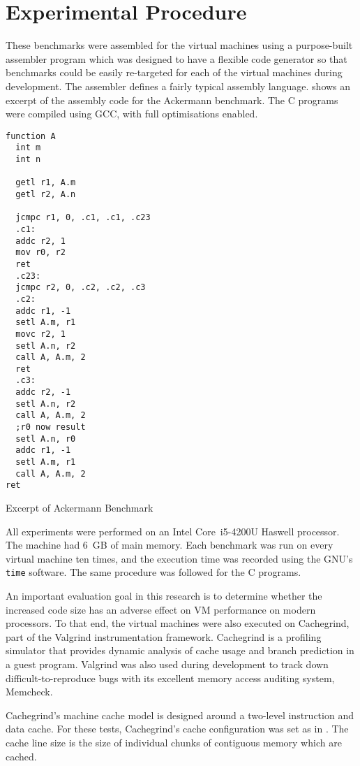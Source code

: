 	\section{Experimental Procedure}
	These benchmarks were assembled for the virtual machines using a purpose-built assembler program which was designed to have a flexible code generator so that benchmarks could be easily re-targeted for each of the virtual machines during development. The assembler defines a fairly typical assembly language.  shows an excerpt of the assembly code for the Ackermann benchmark. The C programs were compiled using GCC, with full optimisations enabled.
	
	\begin{myfigure}
		\begin{lstlisting}
function A
  int m
  int n

  getl r1, A.m
  getl r2, A.n

  jcmpc r1, 0, .c1, .c1, .c23
  .c1:
  addc r2, 1
  mov r0, r2
  ret
  .c23:
  jcmpc r2, 0, .c2, .c2, .c3
  .c2:
  addc r1, -1
  setl A.m, r1
  movc r2, 1
  setl A.n, r2
  call A, A.m, 2
  ret
  .c3:
  addc r2, -1
  setl A.n, r2
  call A, A.m, 2
  ;r0 now result
  setl A.n, r0
  addc r1, -1
  setl A.m, r1
  call A, A.m, 2
ret
		\end{lstlisting}
		\caption{Excerpt of Ackermann Benchmark}
		\label{fig:ackermann}
	\end{myfigure}
	
		All experiments were performed on an Intel Core~i5-4200U Haswell processor. The machine had 6~GB of main memory. Each benchmark was run on every virtual machine ten times, and the execution time was recorded using the GNU's \texttt{time} software. The same procedure was followed for the C programs. 
		
		An important evaluation goal in this research is to determine whether the increased code size has an adverse effect on VM performance on modern processors. To that end, the virtual machines were also executed on Cachegrind, part of the Valgrind instrumentation framework. Cachegrind is a profiling simulator that provides dynamic analysis of cache usage and branch prediction in a guest program. Valgrind was also used during development to track down difficult-to-reproduce bugs with its excellent memory access auditing system, Memcheck.
		
		Cachegrind's machine cache model is designed around a two-level instruction and data cache. For these tests, Cachegrind's cache configuration was set as in . The cache line size is the size of individual chunks of contiguous memory which are cached.
		
